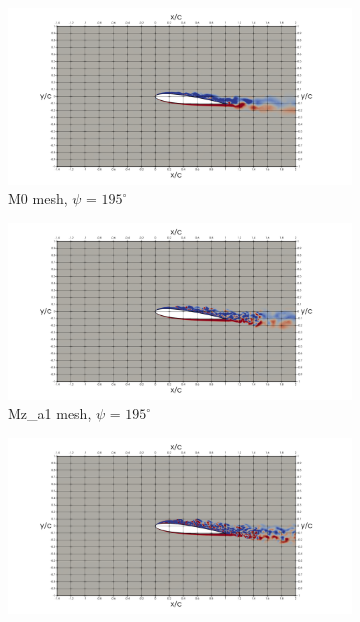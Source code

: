 \begin{figure}[H]
\centering
\begin{subfigure}[b]{0.475\textwidth}
\centering
\includegraphics[width=1.25\textwidth]{figures/vorticity_plots/M0/ph_195.png}
\caption{M0 mesh, $\psi$ = $195^\circ$}
\label{fig:M0_psi195}
\end{subfigure}
\begin{subfigure}[b]{0.475\textwidth}
\centering
\includegraphics[width=1.25\textwidth]{figures/vorticity_plots/Mza1/ph_195.png}
\caption{Mz\_a1 mesh, $\psi$ = $195^\circ$}
\label{fig:Ma1_psi195}
\end{subfigure}
\begin{subfigure}[b]{0.475\textwidth}
\centering
\includegraphics[width=1.25\textwidth]{figures/vorticity_plots/Mza2/ph_195.png}

\end{subfigure}
\end{figure}
